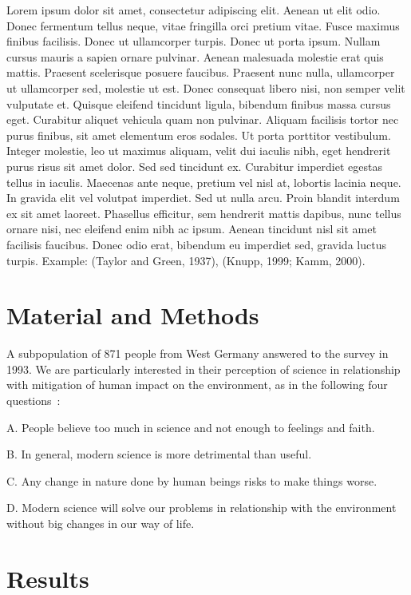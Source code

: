 \documentclass[utf8]{frontiersSCNS}
\begin{document}
Lorem ipsum dolor sit amet, consectetur adipiscing elit. Aenean ut elit
odio. Donec fermentum tellus neque, vitae fringilla orci pretium vitae.
Fusce maximus finibus facilisis. Donec ut ullamcorper turpis. Donec ut
porta ipsum. Nullam cursus mauris a sapien ornare pulvinar. Aenean
malesuada molestie erat quis mattis. Praesent scelerisque posuere
faucibus. Praesent nunc nulla, ullamcorper ut ullamcorper sed, molestie
ut est. Donec consequat libero nisi, non semper velit vulputate et.
Quisque eleifend tincidunt ligula, bibendum finibus massa cursus eget.
Curabitur aliquet vehicula quam non pulvinar. Aliquam facilisis tortor
nec purus finibus, sit amet elementum eros sodales. Ut porta porttitor
vestibulum. Integer molestie, leo ut maximus aliquam, velit dui iaculis
nibh, eget hendrerit purus risus sit amet dolor. Sed sed tincidunt ex.
Curabitur imperdiet egestas tellus in iaculis. Maecenas ante neque,
pretium vel nisl at, lobortis lacinia neque. In gravida elit vel
volutpat imperdiet. Sed ut nulla arcu. Proin blandit interdum ex sit
amet laoreet. Phasellus efficitur, sem hendrerit mattis dapibus, nunc
tellus ornare nisi, nec eleifend enim nibh ac ipsum. Aenean tincidunt
nisl sit amet facilisis faucibus. Donec odio erat, bibendum eu imperdiet
sed, gravida luctus turpis. Example: (Taylor and Green, 1937), (Knupp,
1999; Kamm, 2000).

\hypertarget{material-and-methods}{%
\section{Material and Methods}\label{material-and-methods}}

A subpopulation of 871 people from West Germany answered to the survey
in 1993. We are particularly interested in their perception of science
in relationship with mitigation of human impact on the environment, as
in the following four questions~:

A. People believe too much in science and not enough to feelings and
faith.

B. In general, modern science is more detrimental than useful.

C. Any change in nature done by human beings risks to make things worse.

D. Modern science will solve our problems in relationship with the
environment without big changes in our way of life.

\hypertarget{results}{%
\section{Results}\label{results}}
\end{document}
